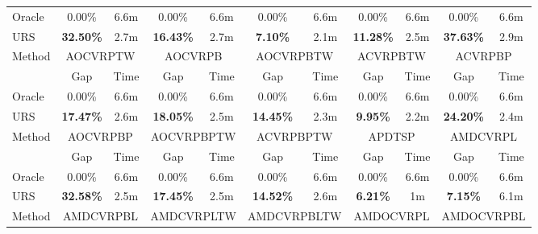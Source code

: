 \documentclass{article}
\theoremstyle{plain}
\theoremstyle{definition}
\theoremstyle{remark}
\begin{document}
\begin{table}[htbp]
{\begin{tabular}{l|cc|cc|cc|cc|cc}
    \midrule
    Oracle & 0.00\% & 6.6m  & 0.00\% & 6.6m  & 0.00\% & 6.6m  & 0.00\% & \multicolumn{1}{c|}{6.6m} & 0.00\% & \multicolumn{1}{c}{6.6m} \\
    URS   &  \cellcolor[HTML]{D0CECE}\textbf{32.50\%} & 2.7m  &  \cellcolor[HTML]{D0CECE}\textbf{16.43\%} & 2.7m  & \cellcolor[HTML]{D0CECE}\textbf{7.10\%} & 2.1m  & \cellcolor[HTML]{D0CECE}\textbf{11.28\%} & \multicolumn{1}{c|}{2.5m} & \cellcolor[HTML]{D0CECE}\textbf{37.63\%} & \multicolumn{1}{c}{2.9m} \\
    \midrule
    \midrule
    \multirow{2}[2]{*}{Method} & \multicolumn{2}{c|}{AOCVRPTW} & \multicolumn{2}{c|}{AOCVRPB} & \multicolumn{2}{c|}{AOCVRPBTW} & \multicolumn{2}{c|}{ACVRPBTW} & \multicolumn{2}{c}{ACVRPBP} \\
          & Gap   & Time  & Gap   & Time  & Gap   & Time  & Gap   & \multicolumn{1}{c|}{Time} & Gap   & \multicolumn{1}{c}{Time} \\
    \midrule
    Oracle & 0.00\% & 6.6m  & 0.00\% & 6.6m  & 0.00\% & 6.6m  & 0.00\% & \multicolumn{1}{c|}{6.6m} & 0.00\% & \multicolumn{1}{c}{6.6m} \\
    URS   & \cellcolor[HTML]{D0CECE}\textbf{17.47\%} & 2.6m  & \cellcolor[HTML]{D0CECE}\textbf{18.05\%} & 2.5m  & \cellcolor[HTML]{D0CECE}\textbf{14.45\%} & 2.3m  & \cellcolor[HTML]{D0CECE}\textbf{9.95\%} & \multicolumn{1}{c|}{2.2m} &  \cellcolor[HTML]{D0CECE}\textbf{24.20\%} & \multicolumn{1}{c}{2.4m} \\
    \midrule
    \midrule
    \multirow{2}[2]{*}{Method} & \multicolumn{2}{c|}{AOCVRPBP} & \multicolumn{2}{c|}{AOCVRPBPTW} & \multicolumn{2}{c|}{ ACVRPBPTW} & \multicolumn{2}{c|}{APDTSP} & \multicolumn{2}{c}{AMDCVRPL} \\
          & Gap   & Time  & Gap   & Time  & Gap   & Time  & Gap   & \multicolumn{1}{c|}{Time} & Gap   & \multicolumn{1}{c}{Time} \\
    \midrule
    Oracle & 0.00\% & 6.6m  & 0.00\% & 6.6m  & 0.00\% & 6.6m  & 0.00\% & \multicolumn{1}{c|}{6.6m} & 0.00\% & \multicolumn{1}{c}{6.6m} \\
    URS   &  \cellcolor[HTML]{D0CECE}\textbf{32.58\%} & 2.5m  &  \cellcolor[HTML]{D0CECE}\textbf{17.45\%} & 2.5m  &  \cellcolor[HTML]{D0CECE}\textbf{14.52\%} & 2.6m  & \cellcolor[HTML]{D0CECE}\textbf{6.21\%} & \multicolumn{1}{c|}{1m} & \cellcolor[HTML]{D0CECE}\textbf{7.15\%} & \multicolumn{1}{c}{6.1m} \\
    \midrule
    \midrule
    \multirow{2}[2]{*}{Method} & \multicolumn{2}{c|}{AMDCVRPBL} & \multicolumn{2}{c|}{AMDCVRPLTW} & \multicolumn{2}{c|}{AMDCVRPBLTW} & \multicolumn{2}{c|}{AMDOCVRPL} & \multicolumn{2}{c}{AMDOCVRPBL} \\

\end{tabular}}
\end{table}
\end{document}

